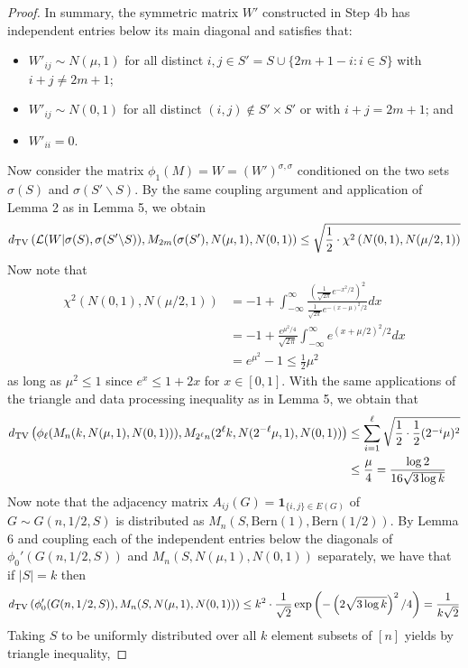 \documentclass[11pt]{article}
\begin{document}
\begin{proof}
In summary, the symmetric matrix $W'$ constructed in Step 4b has independent entries below its main diagonal and satisfies that:
\begin{itemize}
\item $W'_{ij} \sim N(\mu, 1)$ for all distinct $i, j \in S' = S \cup \{ 2m + 1 - i : i \in S\}$ with $i + j \neq 2m + 1$;
\item $W'_{ij} \sim N(0, 1)$ for all distinct $(i, j) \not \in S' \times S'$ or with $i + j = 2m + 1$; and
\item $W'_{ii} = 0$.
\end{itemize}
Now consider the matrix $\phi_1(M) = W = (W')^{\sigma, \sigma}$ conditioned on the two sets $\sigma(S)$ and $\sigma(S' \backslash S)$. By the same coupling argument and application of Lemma 2 as in Lemma 5, we obtain
$$d_{\text{TV}}\left( \mathcal{L}(W|\sigma(S), \sigma(S' \backslash S)), M_{2m}(\sigma(S'), N(\mu, 1), N(0, 1) \right) \le \sqrt{\frac{1}{2} \cdot \chi^2\left( N(0, 1), N(\mu/2, 1) \right)}$$
Now note that
\begin{align*}
\chi^2\left( N(0, 1), N(\mu/2, 1) \right) &= -1 + \int_{-\infty}^\infty \frac{\left( \frac{1}{\sqrt{2\pi}} e^{-x^2/2}\right)^2}{\frac{1}{\sqrt{2\pi}} e^{-(x-\mu)^2/2}}dx \\
&= -1 + \frac{e^{\mu^2/4}}{\sqrt{2\pi}} \int_{-\infty}^\infty e^{(x+\mu/2)^2/2} dx \\
&= e^{\mu^2} - 1 \le \frac{1}{2} \mu^2
\end{align*}
as long as $\mu^2 \le 1$ since $e^x \le 1 + 2x$ for $x \in [0, 1]$. With the same applications of the triangle and data processing inequality as in Lemma 5, we obtain that
\begin{align*}
d_{\text{TV}}\left( \phi_{\ell}(M_n(k, N(\mu, 1), N(0, 1))), M_{2^{\ell} n}(2^{\ell} k, N(2^{-\ell} \mu, 1), N(0, 1)) \right) &\le \sum_{i = 1}^\ell \sqrt{\frac{1}{2} \cdot \frac{1}{2} (2^{-i} \mu)^2} \\
&\le \frac{\mu}{4} = \frac{\log 2}{16 \sqrt{3 \log k}}
\end{align*}
Now note that the adjacency matrix $A_{ij}(G) = \mathbf{1}_{\{i, j \} \in E(G)}$ of $G \sim G(n, 1/2, S)$ is distributed as $M_n(S, \text{Bern}(1), \text{Bern}(1/2))$. By Lemma 6 and coupling each of the independent entries below the diagonals of $\phi_0'(G(n, 1/2, S))$ and $M_n(S, N(\mu, 1), N(0, 1))$ separately, we have that if $|S| = k$ then
$$d_{\text{TV}}\left( \phi_0'(G(n, 1/2, S)), M_n(S, N(\mu, 1), N(0, 1)) \right) \le k^2 \cdot \frac{1}{\sqrt{2}} \exp\left( - \left(2\sqrt{3 \log k}\right)^2/4 \right) = \frac{1}{k\sqrt{2}}$$
Taking $S$ to be uniformly distributed over all $k$ element subsets of $[n]$ yields by triangle inequality,

\end{proof}
\end{document}
